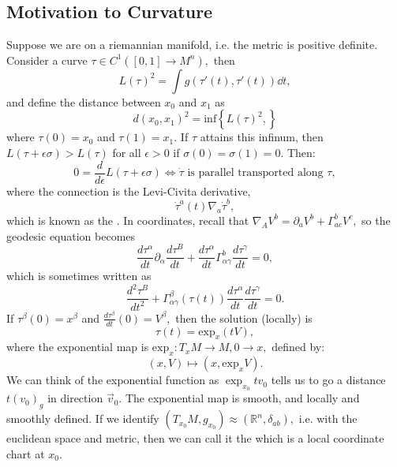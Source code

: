\documentclass{article}
\numberwithin{equation}{section}
\begin{document}
\subsection*{Motivation to Curvature}
Suppose we are on a riemannian manifold, i.e. the metric is positive definite. Consider a curve $\tau \in C^1([0,1] \to M^n),$ then
\begin{equation*}
    L(\tau)^2 = \int g(\tau'(t), \tau'(t)) \dd{t},
\end{equation*} 
and define the distance between $x_0$ and $x_1$ as
\begin{equation*}
    d(x_0,x_1)^2 = \text{inf}\left\{L(\tau)^2,\right\}
\end{equation*}
where $\tau(0)=x_0$ and $\tau(1)=x_1.$ If $\tau$ attains this infinum, then $L(\tau + \epsilon \sigma) > L(\tau)$ for all $\epsilon > 0$ if $\sigma(0)=\sigma(1)=0.$ Then:
\begin{equation*}
    0 = \frac{d}{d\epsilon}L(\tau+\epsilon\sigma) \iff \dot{\tau} \text{ is parallel transported along }\tau,
\end{equation*}  
where the connection is the Levi-Civita derivative,
\begin{equation}
    \dot{\tau}^a(t)\nabla_a \dot{\tau}^b,
\end{equation}
which is known as the . In coordinates, recall that $\nabla_AV^b = \partial_aV^b + \Gamma^b_{ac}V^c,$ so the geodesic equation becomes
\begin{equation}
    \frac{d\tau^\alpha}{dt}\partial_\alpha \frac{d\tau^B}{dt} + \frac{d\tau^\alpha}{dt}\Gamma^{b}_{\alpha\gamma}\frac{d\tau^\gamma}{dt} = 0,
\end{equation}
which is sometimes written as 
\begin{equation}
    \frac{d^2\tau^B}{dt^2} + \Gamma^\beta_{\alpha\gamma}(\tau(t)) \frac{d\tau^\alpha}{dt}\frac{d\tau^\gamma}{dt} = 0.
\end{equation}
If $\tau^\beta(0) = x^\beta$ and $\frac{d\tau^\beta}{dt}(0) = V^\beta,$ then the solution (locally) is
\begin{equation*}
    \tau(t) = \text{exp}_x(tV),
\end{equation*}
where the exponential map is $\text{exp}_x:T_xM \to M, 0 \to x,$ defined by:
\begin{equation*}
    (x,V) \mapsto (x,\text{exp}_xV).
\end{equation*}
We can think of the exponential function as $\exp_{x_0}tv_0$ tells us to go a distance $t(v_0)_g$ in direction $\vec{v}_0.$ The exponential map is smooth, and locally and smoothly defined. If we identify $(T_{x_0}M,g_{x_0})\approx (\mathbb{R}^n,\delta_{ab}),$ i.e. with the euclidean space and metric, then we can call it the  which is a local coordinate chart at $x_0.$
\end{document}
